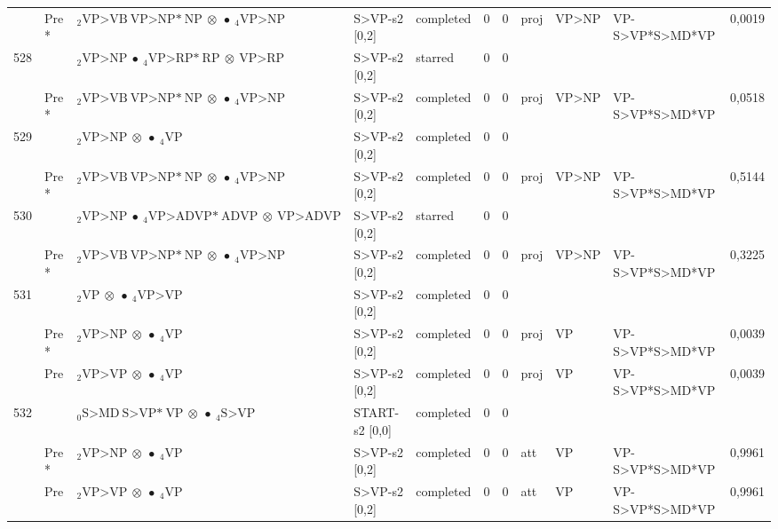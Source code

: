 \documentclass[10pt]{article}
\begin{document}
\begin{longtable}[htbp]{lllllllllll}
 & Pre *& $ {}_2 \textrm{VP>VB} \ \textrm{VP>NP*} \ \textrm{NP} \  \otimes \  \bullet \ {}_{4} \textrm{VP>NP} $ & S>VP-s2 [0,2] & completed & 0 & 0 & proj & VP>NP & VP-S>VP*S>MD*VP & 0,0019 \\ 
528 & & $ {}_2 \textrm{VP>NP} \  \bullet \ {}_{4} \textrm{VP>RP*} \ \textrm{RP} \  \otimes \ \textrm{VP>RP} $ & S>VP-s2 [0,2] & starred & 0 & 0 & & & & \\ 
 & Pre *& $ {}_2 \textrm{VP>VB} \ \textrm{VP>NP*} \ \textrm{NP} \  \otimes \  \bullet \ {}_{4} \textrm{VP>NP} $ & S>VP-s2 [0,2] & completed & 0 & 0 & proj & VP>NP & VP-S>VP*S>MD*VP & 0,0518 \\ 
529 & & $ {}_2 \textrm{VP>NP} \  \otimes \  \bullet \ {}_{4} \textrm{VP} $ & S>VP-s2 [0,2] & completed & 0 & 0 & & & & \\ 
 & Pre *& $ {}_2 \textrm{VP>VB} \ \textrm{VP>NP*} \ \textrm{NP} \  \otimes \  \bullet \ {}_{4} \textrm{VP>NP} $ & S>VP-s2 [0,2] & completed & 0 & 0 & proj & VP>NP & VP-S>VP*S>MD*VP & 0,5144 \\ 
530 & & $ {}_2 \textrm{VP>NP} \  \bullet \ {}_{4} \textrm{VP>ADVP*} \ \textrm{ADVP} \  \otimes \ \textrm{VP>ADVP} $ & S>VP-s2 [0,2] & starred & 0 & 0 & & & & \\ 
 & Pre *& $ {}_2 \textrm{VP>VB} \ \textrm{VP>NP*} \ \textrm{NP} \  \otimes \  \bullet \ {}_{4} \textrm{VP>NP} $ & S>VP-s2 [0,2] & completed & 0 & 0 & proj & VP>NP & VP-S>VP*S>MD*VP & 0,3225 \\ 
531 & & $ {}_2 \textrm{VP} \  \otimes \  \bullet \ {}_{4} \textrm{VP>VP} $ & S>VP-s2 [0,2] & completed & 0 & 0 & & & & \\ 
 & Pre *& $ {}_2 \textrm{VP>NP} \  \otimes \  \bullet \ {}_{4} \textrm{VP} $ & S>VP-s2 [0,2] & completed & 0 & 0 & proj & VP & VP-S>VP*S>MD*VP & 0,0039 \\ 
 & Pre & $ {}_2 \textrm{VP>VP} \  \otimes \  \bullet \ {}_{4} \textrm{VP} $ & S>VP-s2 [0,2] & completed & 0 & 0 & proj & VP & VP-S>VP*S>MD*VP & 0,0039 \\ 
532 & & $ {}_0 \textrm{S>MD} \ \textrm{S>VP*} \ \textrm{VP} \  \otimes \  \bullet \ {}_{4} \textrm{S>VP} $ & START-s2 [0,0] & completed & 0 & 0 & & & & \\ 
 & Pre *& $ {}_2 \textrm{VP>NP} \  \otimes \  \bullet \ {}_{4} \textrm{VP} $ & S>VP-s2 [0,2] & completed & 0 & 0 & att & VP & VP-S>VP*S>MD*VP & 0,9961 \\ 
 & Pre & $ {}_2 \textrm{VP>VP} \  \otimes \  \bullet \ {}_{4} \textrm{VP} $ & S>VP-s2 [0,2] & completed & 0 & 0 & att & VP & VP-S>VP*S>MD*VP & 0,9961 \\ 

\end{longtable}
\end{document}
